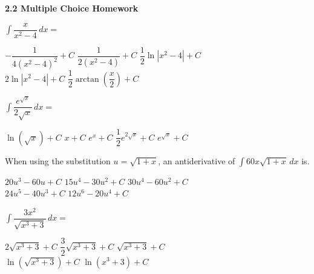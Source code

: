 \textbf{\large{2.2 Multiple Choice Homework}} \par

\begin{questions}
    \question $\int \dfrac{x}{x^2 - 4} \, dx = $ \\

    \begin{oneparchoices}
        \choice $-\dfrac{1}{4\left(x^2 - 4\right)^2} + C$
        \choice $\dfrac{1}{2\left(x^2 - 4\right)} + C$
        \choice $\dfrac{1}{2}\ln |x^2 - 4| + C$ \\[11pt]
        \makebox[0.22\textwidth] \choice $2\ln |x^2 - 4| + C$ 
        \makebox[0.22\textwidth] \choice $\dfrac{1}{2}\arctan \left(\dfrac{x}{2}\right) + C$
    \end{oneparchoices} \par \horizontalline

    \question $\int \dfrac{e^{\sqrt{x}}}{2\sqrt{x}} \, dx = $ \\

    \begin{oneparchoices}
        \choice $\ln \left(\sqrt{x}\right) + C$
        \choice $x + C$
        \choice $e^x + C$
        \choice $\dfrac{1}{2}e^{2\sqrt{x}} + C$
        \choice $e^{\sqrt{x}} + C$
    \end{oneparchoices} \par \horizontalline

    \question When using the substitution $u = \sqrt{1 + x}$, an antiderivative of $\int 60x\sqrt{1 + x} \, dx$ is. \\

    \begin{oneparchoices}
        \choice $20u^3 - 60u + C$ 
        \choice $15u^4 - 30u^2 + C$
        \choice $30u^4 - 60u^2 + C$ \\[11pt]
        \makebox[0.22\textwidth] \choice $24u^5 - 40u^3 + C$
        \makebox[0.22\textwidth] \choice $12u^6 - 20u^4 + C$
    \end{oneparchoices} \par \horizontalline

    \question $\int \dfrac{3x^2}{\sqrt{x^3 + 3}} \, dx = $ \\

    \begin{oneparchoices}
        \choice $2\sqrt{x^3 + 3} + C$ 
        \choice $\dfrac{3}{2}\sqrt{x^3 + 3} + C$
        \choice $\sqrt{x^3 + 3} + C$ \\[11pt]
        \makebox[0.22\textwidth] \choice $\ln \left(\sqrt{x^3 + 3}\right) + C$
        \makebox[0.21\textwidth] \choice $\ln \left(x^3 + 3\right) + C$
    \end{oneparchoices} \par \horizontalline


\end{questions}

